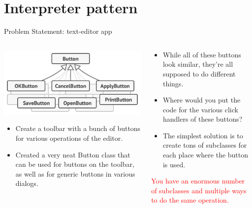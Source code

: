 \documentclass[13pt]{beamer}
\begin{document}
\section{Interpreter pattern}

\begin{frame}{Problem Statement: text-editor app}
	\begin{columns}[T]
		\begin{column}{.5\textwidth}
			\includegraphics[scale=0.4]{./images/problem.png}
			\begin{itemize}
				\item Create a toolbar with a bunch of buttons for various operations of the editor.
				\item Created a very neat Button class that can be used for buttons on the toolbar, as well as for generic buttons in various dialogs.
			\end{itemize}
		\end{column}
	
		\begin{column}{.5\textwidth}
			\begin{itemize}
				\item While all of these buttons look similar, they’re all supposed to do different things.
				\item Where would you put the code for the various click handlers of these buttons? 
				\item The simplest solution is to create tons of subclasses for each place where the button is used.
			\end{itemize}
			\textcolor{red}{You have an enormous number of subclasses and multiple ways to do the same operation.}
		\end{column}
	\end{columns}
\end{frame}
\end{document}
